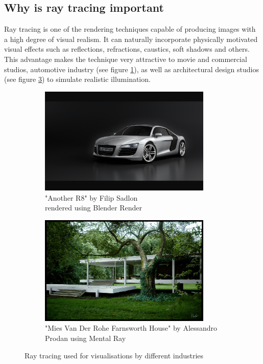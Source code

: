 \documentclass{article}
\begin{document}
\subsection{Why is ray tracing important}
Ray tracing is one of the rendering techniques capable of producing images with a high degree of visual realism. It can naturally incorporate physically motivated visual effects such as reflections, refractions, caustics, soft shadows and others. This advantage makes the technique very attractive to movie and commercial studios, automotive industry (see figure \ref{fig:audi}), as well as architectural design studios (see figure \ref{fig:arch}) to simulate realistic illumination.  

\begin{figure}[h]
	\centering
	
	\begin{subfigure}{0.5\textwidth}
		\includegraphics[width=0.9\textwidth]{audi}
		\caption{"Another R8" by Filip Sadlon \\ rendered using Blender Render}
		\label{fig:audi}
	\end{subfigure}%
	\hfill
	\begin{subfigure}{0.5\textwidth}
		\includegraphics[width=0.9\textwidth]{archi_render}
		\caption{"Mies Van Der Rohe Farnsworth House" by Alessandro Prodan using Mental Ray}
		\label{fig:arch}
	\end{subfigure}
	
	\caption{Ray tracing used for visualisations by different industries}
\end{figure}
\end{document}

